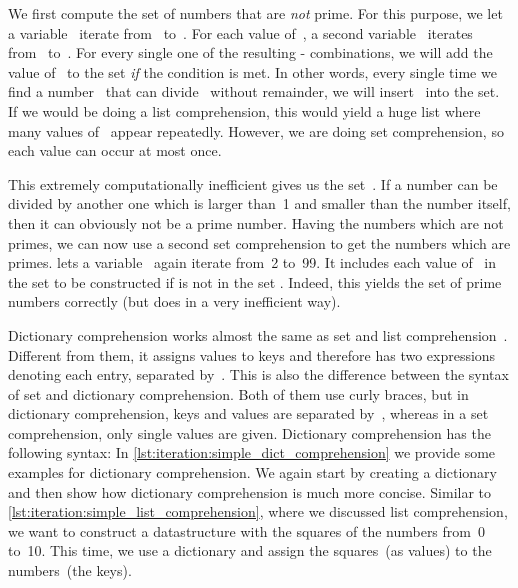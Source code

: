 We first compute the set of numbers that are \emph{not} prime.
For this purpose, we let a variable~ iterate from~ to~.
For each value of~, a second variable~ iterates from~ to~.
For every single one of the resulting \nobreakdashes- combinations, we will add the value of~ to the set \emph{if} the condition  is met.
In other words, every single time we find a number~ that can divide~ without remainder, we will insert~ into the set.
If we would be doing a list comprehension, this would yield a huge list where many values of~ appear repeatedly.
However, we are doing set comprehension, so each value can occur at most once.%
%
\begin{sloppypar}%
This extremely computationally inefficient gives us the set~.
If a number can be divided by another one which is larger than~1 and smaller than the number itself, then it can obviously not be a prime number.
Having the numbers which are not primes, we can now use a second set comprehension to get the numbers which are primes.
 lets a variable~ again iterate from~2 to~99.
It includes each value of~ in the set to be constructed if  is not in the set .
Indeed, this yields the set of prime numbers correctly (but does in a very inefficient way).%
\end{sloppypar}%
%
\FloatBarrier%
\endhsection%
%
%
%
Dictionary comprehension works almost the same as set and list comprehension~\cite{PEP274}.
Different from them, it assigns values to keys and therefore has two expressions denoting each entry, separated by~\pythonilIdx{:}.
This is also the difference between the syntax of set and dictionary comprehension.
Both of them use curly braces, but in dictionary comprehension, keys and values are separated by~\pythonilIdx{:}, whereas in a set comprehension, only single values are given.
Dictionary comprehension has the following syntax:%
%
%
%
%
%
%
In \cref{lst:iteration:simple_dict_comprehension} we provide some examples for dictionary comprehension.
We again start by  creating a dictionary and then show how dictionary comprehension is much more concise.
Similar to \cref{lst:iteration:simple_list_comprehension}, where we discussed list comprehension, we want to construct a datastructure with the squares of the numbers from~0 to~10.
This time, we use a dictionary and assign the squares~(as values) to the numbers~(the keys).

